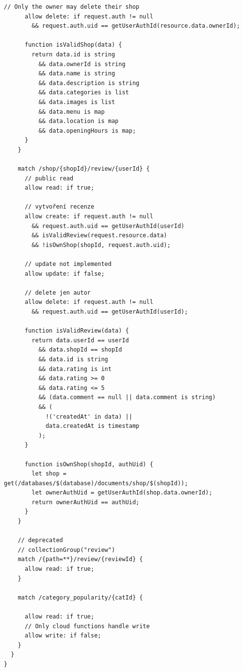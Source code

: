 \begin{lstlisting}[language=FirestoreRules, caption={Ukázka pravidel pro Firestore}, label={lst:firestore-rules}]
      // Only the owner may delete their shop
      allow delete: if request.auth != null
        && request.auth.uid == getUserAuthId(resource.data.ownerId);

      function isValidShop(data) {
        return data.id is string
          && data.ownerId is string
          && data.name is string
          && data.description is string
          && data.categories is list
          && data.images is list
          && data.menu is map
          && data.location is map
          && data.openingHours is map;
      }
    }

    match /shop/{shopId}/review/{userId} {
      // public read
      allow read: if true;

      // vytvoření recenze
      allow create: if request.auth != null
        && request.auth.uid == getUserAuthId(userId)
        && isValidReview(request.resource.data)
        && !isOwnShop(shopId, request.auth.uid);

      // update not implemented
      allow update: if false;

      // delete jen autor
      allow delete: if request.auth != null
        && request.auth.uid == getUserAuthId(userId);

      function isValidReview(data) {
        return data.userId == userId
          && data.shopId == shopId
          && data.id is string
          && data.rating is int
          && data.rating >= 0
          && data.rating <= 5
          && (data.comment == null || data.comment is string)
          && (
            !('createdAt' in data) ||
            data.createdAt is timestamp
          );
      }

      function isOwnShop(shopId, authUid) {
        let shop = get(/databases/$(database)/documents/shop/$(shopId));
        let ownerAuthUid = getUserAuthId(shop.data.ownerId);
        return ownerAuthUid == authUid;
      }
    }

    // deprecated
    // collectionGroup("review")
    match /{path=**}/review/{reviewId} {
      allow read: if true;
    }

    match /category_popularity/{catId} {

      allow read: if true;
      // Only cloud functions handle write
      allow write: if false;
    }
  }
}
\end{lstlisting}